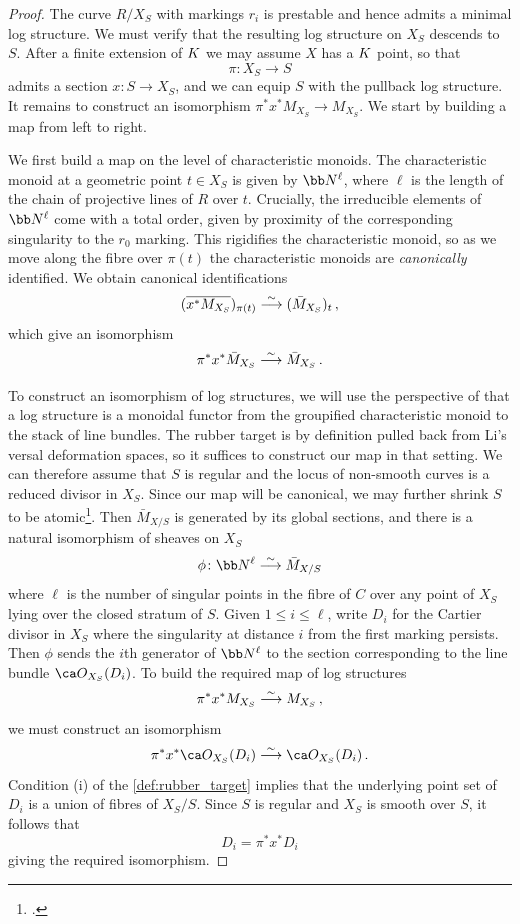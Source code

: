 \begin{proof}
The curve $R/X_S$ with markings $r_i$ is prestable and hence admits a minimal log structure. We must verify that the resulting log structure on $X_S$ descends to $S$. After a finite extension of $K$ we may assume $X$ has a $K$ point, so that $$\pi\colon X_S \to S$$
admits a section $x\colon S \to X_S$, and we can equip $S$ with the pullback log structure. It remains to construct an isomorphism $\pi^*x^* M_{X_S} \to M_{X_S}$. We start by building a map from left to right. %

We first build a map on the level of characteristic monoids. The characteristic monoid at a geometric point $t \in X_S$ is given by $\bb N^\ell$, where $\ell$ is the length of the chain of projective lines of $R$ over $t$. Crucially, the irreducible elements of $\bb N^\ell$ come with a total order, given by proximity of the corresponding singularity to the $r_0$ marking. This rigidifies the characteristic monoid, so as we move along the fibre over $\pi(t)$ the characteristic monoids are \emph{canonically} identified. We
obtain canonical identifications
$$(\overline{x^*M_{X_S}})_{\pi(t)} \stackrel{\sim}{\longrightarrow} (\bar{M}_{X_S})_t\, ,$$
which give an isomorphism
$$\pi^*x^* \bar M_{X_S} \stackrel{\sim}{\longrightarrow} \bar{M}_{X_S}\, .$$


 To construct an isomorphism of log structures, we will use the perspective of \cite[Section 3.1]{borne-vistoli} that a log structure is a monoidal functor from the groupified characteristic monoid to the stack of line bundles. The rubber target is by definition pulled back from  Li's versal deformation spaces, so it suffices to construct our map in that setting. We can
 therefore assume that $S$ is regular and the locus of non-smooth curves is a reduced divisor in $X_S$.
 Since our map will be canonical, we may further shrink $S$ to be atomic\footnote{\cite[Definition 2.2.4]{Abram_wise_birational}.}. Then $\bar M_{X/S}$ is generated by its global sections, and there is a natural isomorphism of sheaves on $X_S$
 $$\phi\colon \bb N^\ell \isom \bar M_{X/S}$$
 where $\ell$ is the number of singular points in the fibre of $C$ over any point of $X_S$ lying over the closed stratum of $S$. Given $1 \le i \le \ell$, write $D_i$ for the Cartier divisor in $X_S$ where the singularity at distance $i$ from the first marking persists. Then $\phi$ sends the $i$th generator  of $\bb N^\ell$ to the section corresponding to the line bundle $\ca O_{X_S}(D_i)$. To build the required map of log structures $$\pi^*x^*M_{X_S} \stackrel{\sim}{\longrightarrow} M_{X_S}\, ,$$ we must construct an isomorphism
$$\pi^*x^*\ca O_{X_S}(D_i) \isom \ca O_{X_S}(D_i)\, .$$
Condition (i) of the \cref{def:rubber_target} implies that the underlying point set of $D_i$ is a union of fibres of $X_S/S$. Since $S$ is regular and $X_S$ is smooth over $S$, it follows that
$$D_i = \pi^*x^*D_i$$
giving the required isomorphism. %


\end{proof}
